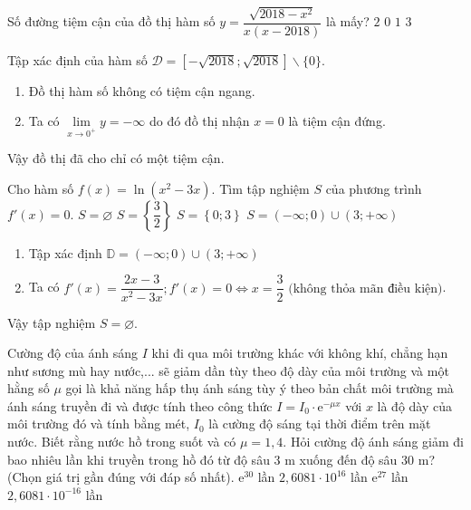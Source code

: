 \begin{ex}%
Số đường tiệm cận của đồ thị hàm số $y = \dfrac{\sqrt{2018-x^2}}{x(x-2018)}$ là mấy?
\choice
{$2$}
{$0$}
{\True $1$}
{$3$}
\loigiai
{
Tập xác định của hàm số $\mathscr{D} =\left [ -\sqrt{2018};\sqrt{2018}\right ] \backslash \{0\}$.
\begin{enumerate}
	\item Đồ thị hàm số không có tiệm cận ngang.
	\item Ta có $\lim\limits_{x \to 0^+} y = -\infty$ do đó đồ thị nhận $x=0$ là tiệm cận đứng.
\end{enumerate}
Vậy đồ thị đã cho chỉ có một tiệm cận.

}
\end{ex}

\begin{ex}%
Cho hàm số $f(x)=\ln \left (x^2-3x\right )$. Tìm tập nghiệm $S$ của phương trình $f'(x) =0$.		
\choice
{\True $S= \varnothing$}
{$S =\left\{ \dfrac{3}{2}\right \}$}
{$S =\left\{0;3\right \}$}
{$S =\left( -\infty;0\right ) \cup \left (3;+\infty\right )$}
\loigiai
{
\begin{enumerate}
	\item Tập xác định $\mathbb{D} =(-\infty;0)\cup (3;+\infty)$
	\item Ta có $f'(x) =\dfrac{2x-3}{x^2 -3x}; f'(x) =0\Leftrightarrow x=\dfrac{3}{2} \text{ (không thỏa mãn điều kiện)}$.
\end{enumerate}
Vậy tập nghiệm $S = \varnothing$.
}

\end{ex}
\begin{ex}%
Cường độ của ánh sáng $I$ khi đi qua môi trường khác với không khí, chẳng hạn như sương mù hay nước,... sẽ giảm dần tùy theo độ dày của môi trường và một hằng số $\mu $ gọi là khả năng hấp thụ ánh sáng tùy ý theo bản chất môi trường mà ánh sáng truyền đi và được tính theo công thức $I=I_0\cdot\text{e}^{-\mu x}$ với $x$ là độ dày của môi trường đó và tính bằng mét, $I_0$ là cường độ sáng tại thời điểm trên mặt nước. Biết rằng nước hồ trong suốt và có $\mu =1{,}4$. Hỏi cường độ  ánh sáng giảm đi bao nhiêu lần khi truyền trong hồ đó từ độ sâu $3$ m  xuống đến độ sâu $30$ m? (Chọn giá trị gần đúng với đáp số nhất).	
\choice
{$\mathrm{e}^{30}$ lần}
{\True $2{,}6081\cdot 10^{16}$ lần}
{$\mathrm{e}^{27}$ lần}
{$2{,}6081\cdot 10^{-16}$ lần}

\end{ex}


